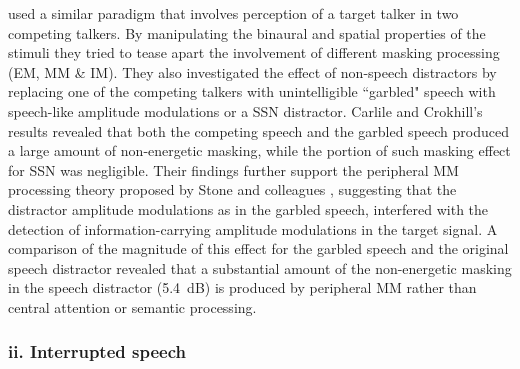 \documentclass[a4paper, twoside]{templates/ociamthesis}
\begin{document}
\textcite{Carlile2015} used a similar paradigm that involves perception of a target talker in two competing talkers. By manipulating the binaural and spatial properties of the stimuli they tried to tease apart the involvement of different masking processing (EM, MM \& IM). They also investigated the effect of non-speech distractors by replacing one of the competing talkers with unintelligible ``garbled" speech with speech-like amplitude modulations or a SSN distractor. Carlile and Crokhill's results revealed that both the competing speech and the garbled speech produced a large amount of non-energetic masking, while the portion of such masking effect for SSN was negligible. Their findings further support the peripheral MM processing theory proposed by Stone and colleagues \autocite{Stone2012,Stone2014}, suggesting that the distractor amplitude modulations as in the garbled speech, interfered with the detection of information-carrying amplitude modulations in the target signal. A comparison of the magnitude of this effect for the garbled speech and the original speech distractor revealed that a substantial amount of the non-energetic masking in the speech distractor (5.4~dB) is produced by peripheral MM rather than central attention or semantic processing.\\

\hypertarget{ii.-interrupted-speech}{%
\subsubsection*{ii. Interrupted speech}\label{ii.-interrupted-speech}}
\end{document}
